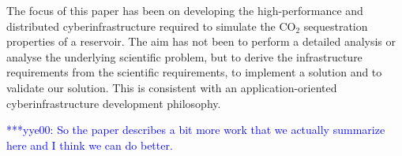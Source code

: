 \documentclass{acm_proc_article-sp}
\newcommand{\yyenote}[1]{ {\textcolor{blue} { ***yye00: #1 }}}
\newcommand{\yyenote}[1]{}
\begin{document}
The focus of this paper has been on developing the high-performance
and distributed cyberinfrastructure required to simulate the CO$_2$
sequestration properties of a reservoir. The aim has not been to
perform a detailed analysis or analyse the underlying scientific
problem, but to derive the infrastructure requirements from the
scientific requirements, to implement a solution and to validate our
solution. This is consistent with an application-oriented
cyberinfrastructure development philosophy.

\yyenote{So the paper describes a bit more work that we actually summarize here and I think we can do better.}

%


\end{document}
